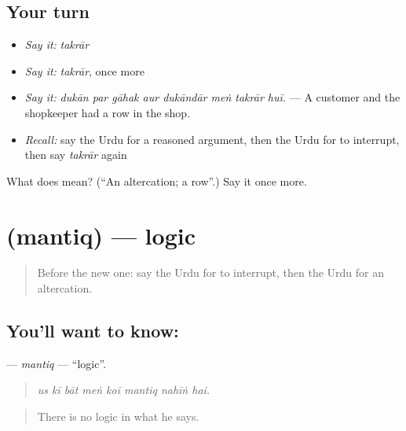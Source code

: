 \subsection*{Your turn}
\begin{itemize}
\raggedright
  \item \emph{Say it:} \emph{takrār}
  \item \emph{Say it:} \emph{takrār}, once more
  \item \emph{Say it:} \emph{dukān par gāhak aur dukāndār meṅ takrār huī.} — A customer and the shopkeeper had a row in the shop.
  \item \emph{Recall:} say the Urdu for a reasoned argument, then the Urdu for to interrupt, then say \emph{takrār} again
\end{itemize}

\begin{tcolorbox}[breakable,colback=teal!4,colframe=teal!35!black,title={Before you move on}]
What does  mean? (\textquotedblleft{}An altercation; a row\textquotedblright{}.) Say it once more.
\end{tcolorbox}
\section[\texorpdfstring{\ur{منطق} (mantiq)}{منطق (mantiq)}]{ (mantiq) — logic}

\label{lesson:UR-C334-mantiq}



\begin{quote}
Before the new one: say the Urdu for to interrupt, then the Urdu for an altercation.
\end{quote}

\subsection*{You'll want to know: }
\textbf{} — \emph{mantiq} — \textquotedblleft{}logic\textquotedblright{}.

\begin{quote}
       
\end{quote}

\begin{quote}
\emph{us kī bāt meṅ koī mantiq nahīṅ hai.}
\end{quote}

\begin{quote}
There is no logic in what he says.
\end{quote}

